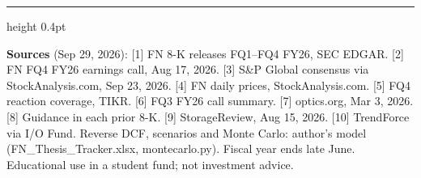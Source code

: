 \documentclass[9pt,letterpaper]{extarticle}
\begin{document}
\vspace{-4pt}
{\color{rule}\hrule height 0.4pt}
\vspace{2pt}
{\scriptsize\color{black!70}
\textbf{Sources} (Sep 29, 2026): [1] FN 8-K releases FQ1--FQ4 FY26, SEC EDGAR. [2] FN FQ4 FY26 earnings call, Aug 17, 2026. [3] S\&P Global consensus via StockAnalysis.com, Sep 23, 2026. [4] FN daily prices, StockAnalysis.com. [5] FQ4 reaction coverage, TIKR. [6] FQ3 FY26 call summary. [7] optics.org, Mar 3, 2026. [8] Guidance in each prior 8-K. [9] StorageReview, Aug 15, 2026. [10] TrendForce via I/O Fund. Reverse DCF, scenarios and Monte Carlo: author's model (FN\_Thesis\_Tracker.xlsx, montecarlo.py). Fiscal year ends late June. Educational use in a student fund; not investment advice.\par}
\end{document}
